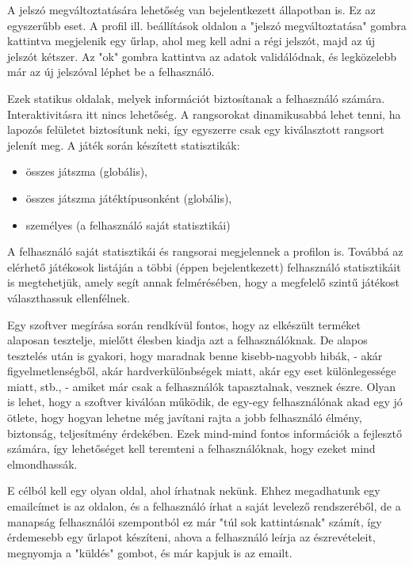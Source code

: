 A jelszó megváltoztatására lehetőség van bejelentkezett állapotban is. Ez az egyszerűbb eset. A profil ill. beállítások oldalon a "jelszó megváltoztatása" gombra kattintva megjelenik egy űrlap, ahol meg kell adni a régi jelszót, majd az új jelszót kétszer. Az "ok" gombra kattintva az adatok validálódnak, és legközelebb már az új jelszóval léphet be a felhasználó.

Ezek statikus oldalak, melyek információt biztosítanak a felhasználó számára. Interaktivitásra itt nincs lehetőség. A rangsorokat dinamikusabbá lehet tenni, ha lapozós felületet biztosítunk neki, így egyszerre csak egy kiválasztott rangsort jelenít meg.
A játék során készített statisztikák:
\begin{itemize}
	\item összes játszma (globális),
	\item összes játszma játéktípusonként (globális),
	\item személyes (a felhasználó saját statisztikái)
\end{itemize}
A felhasználó saját statisztikái és rangsorai megjelennek a profilon is. Továbbá az elérhető játékosok listáján a többi (éppen bejelentkezett) felhasználó statisztikáit is megtehetjük, amely segít annak felmérésében, hogy a megfelelő szintű játékost választhassuk ellenfélnek.

Egy szoftver megírása során rendkívül fontos, hogy az elkészült terméket alaposan tesztelje, mielőtt élesben kiadja azt a felhasználóknak. De alapos tesztelés után is gyakori, hogy maradnak benne kisebb-nagyobb hibák, - akár figyelmetlenségből, akár hardverkülönbségek miatt, akár egy eset különlegessége miatt, stb., - amiket már csak a felhasználók tapasztalnak, vesznek észre. Olyan is lehet, hogy a szoftver kiválóan működik, de egy-egy felhasználónak akad egy jó ötlete, hogy hogyan lehetne még javítani rajta a jobb felhasználó élmény, biztonság, teljesítmény érdekében. Ezek mind-mind fontos információk a fejlesztő számára, így lehetőséget kell teremteni a felhasználóknak, hogy ezeket mind elmondhassák.

E célból kell egy olyan oldal, ahol írhatnak nekünk. Ehhez megadhatunk egy emailcímet is az oldalon, és a felhasználó írhat a saját levelező rendszeréből, de a manapság felhasználói szempontból ez már "túl sok kattintásnak" számít, így érdemesebb egy űrlapot készíteni, ahova a felhasználó leírja az észrevételeit, megnyomja a "küldés" gombot, és már kapjuk is az emailt.

